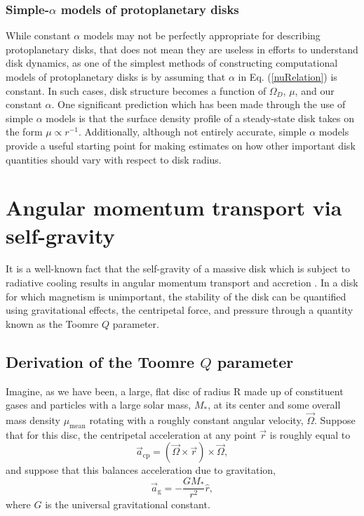 \documentclass[aps,pra,twocolumn]{revtex4-1}
\begin{document}
\subsubsection{\label{section 2.3.1} Simple-$\alpha$ models of protoplanetary disks}
While constant $\alpha$ models may not be perfectly appropriate for describing protoplanetary disks, that does not mean they are useless in efforts to understand disk dynamics, as one of the simplest methods of constructing computational models of protoplanetary disks is by assuming that $\alpha$ in Eq. (\ref{nuRelation}) is constant.  In such cases, disk structure becomes a function of $\Omega_D$, $\mu$, and our constant $\alpha$.  One significant prediction which has been made through the use of simple $\alpha$ models is that the surface density profile of a steady-state disk takes on the form $\mu \propto r^{-1}$.  Additionally, although not entirely accurate, simple $\alpha$ models provide a useful starting point for making estimates on how other important disk quantities should vary with respect to disk radius.  




\section{\label{section 3} Angular momentum transport via self-gravity}
It is a well-known fact that the self-gravity of a massive disk which is subject to radiative cooling results in angular momentum transport and accretion \cite{armitage2011}.  In a disk for which magnetism is unimportant, the stability of the disk can be quantified using gravitational effects, the centripetal force, and pressure through a quantity known as the Toomre $Q$ parameter.

\subsection{\label{section 3.1} Derivation of the Toomre $Q$ parameter}
Imagine, as we have been, a large, flat disc of radius R made up of constituent gases and particles with a large solar mass, $M_*$, at its center and some overall mass density $\mu_{\text{mean}}$ rotating with a roughly constant angular velocity, $\vec{\Omega}$. Suppose that for this disc, the centripetal acceleration at any point $\vec{r}$ is roughly equal to 
\begin{equation}
\vec{a}_{\text{cp}} = \left( \vec{\Omega} \times \vec{r} \right) \times \vec{\Omega} ,
\end{equation}
and suppose that this balances acceleration due to gravitation,
\begin{equation}
\vec{a}_{\text{g}} = -\frac{G M_*}{r^2}\hat{r}, 
\end{equation}
where $G$ is the universal gravitational constant.
\end{document}
